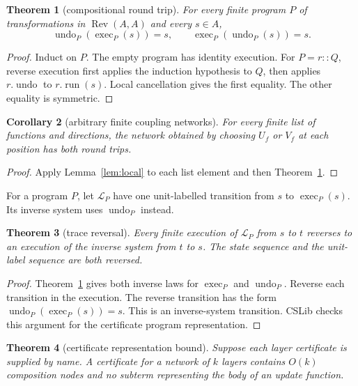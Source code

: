 \documentclass[aop,preprint]{../aop-template/imsart}
\newtheorem{theorem}{Theorem}
\newtheorem{corollary}[theorem]{Corollary}
\theoremstyle{definition}
\newcommand{\Rev}{\operatorname{Rev}}
\newcommand{\Exec}{\operatorname{exec}}
\newcommand{\Undo}{\operatorname{undo}}
\begin{document}
\begin{theorem}[compositional round trip]\label{thm:roundtrip}
For every finite program $P$ of transformations in $\Rev(A,A)$ and every $s\in A$,
\[
 \Undo_P(\Exec_P(s))=s,
 \qquad
 \Exec_P(\Undo_P(s))=s.
\]
\end{theorem}

\begin{proof}
Induct on $P$. The empty program has identity execution. For $P=r::Q$, reverse execution first applies the induction hypothesis to $Q$, then applies $r.\operatorname{undo}$ to $r.\operatorname{run}(s)$. Local cancellation gives the first equality. The other equality is symmetric.
\end{proof}

\begin{corollary}[arbitrary finite coupling networks]
For every finite list of functions and directions, the network obtained by choosing $U_f$ or $V_f$ at each position has both round trips.
\end{corollary}

\begin{proof}
Apply Lemma~\ref{lem:local} to each list element and then Theorem~\ref{thm:roundtrip}.
\end{proof}

For a program $P$, let $\mathcal{L}_P$ have one unit-labelled transition from $s$ to $\Exec_P(s)$. Its inverse system uses $\Undo_P$ instead.

\begin{theorem}[trace reversal]\label{thm:trace}
Every finite execution of $\mathcal{L}_P$ from $s$ to $t$ reverses to an execution of the inverse system from $t$ to $s$. The state sequence and the unit-label sequence are both reversed.
\end{theorem}

\begin{proof}
Theorem~\ref{thm:roundtrip} gives both inverse laws for $\Exec_P$ and $\Undo_P$. Reverse each transition in the execution. The reverse transition has the form $\Undo_P(\Exec_P(s))=s$. This is an inverse-system transition. CSLib checks this argument for the certificate program representation.
\end{proof}

\begin{theorem}[certificate representation bound]
Suppose each layer certificate is supplied by name. A certificate for a network of $k$ layers contains $O(k)$ composition nodes and no subterm representing the body of an update function.
\end{theorem}
\end{document}
